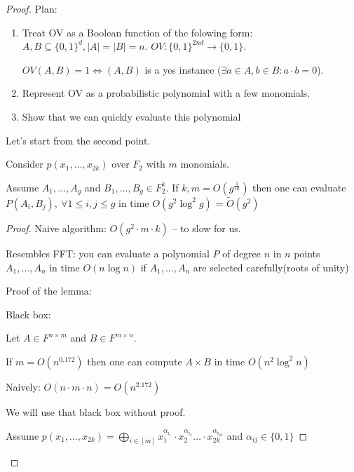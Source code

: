 \begin{proof}
	Plan:
	\begin{enumerate}
		\item Treat OV as a Boolean function of the folowing form: $A, B \subseteq \{0, 1\}^d, |A| = |B| = n$.
			$OV : \{0, 1\}^{2nd} \to \{0, 1\}$.

			$OV(A, B) = 1 \Longleftrightarrow (A, B)$ is a yes instance ($\exists a \in A, b \in B : a \cdot b = 0$).

		\item Represent OV as a probabilistic polynomial with a few monomials.
		\item Show that we can quickly evaluate this polynomial
	\end{enumerate}

	Let's start from the second point.


	\begin{lm}
		Consider $p(x_1, \dots, x_{2k})$ over $F_2$ with $m$ monomials.

		Assume $A_1, \dots, A_g$ and $B_1, \dots, B_g \in F_2^k$.
		If $k, m = O(g^{\frac{1}{10}})$ then one can evaluate $P(A_i, B_j) ,\ \forall 1 \leq i, j \leq g$ in time $O(g^2 \log^2g)$ = $\widetilde{O}(g^2)$
	\end{lm}

	\begin{proof}
		Naive algorithm: $O(g^2 \cdot m \cdot k)$ -- to slow for us.

		\begin{remrk*}
			Resembles FFT: you can evaluate a polynomial $P$ of degree $n$ in $n$ points $A_1, \dots, A_n$ in time $O(n \log n)$ if $A_1, \dots, A_n$ are selected carefully(roots of unity)
		\end{remrk*}

		Proof of the lemma:

		Black box:
		\begin{thm}[Coopersmith, 198?]
			Let $A \in F^{n \times m}$ and $B \in F^{m \times n}$.

			If $m = O(n^{0.172})$ then one can compute $A \times B$ in time $O(n^2 \log ^{2} n)$

			Naively: $O(n \cdot m \cdot n) = O(n^{2.172})$
		\end{thm}

		We will use that black box without proof.

		Assume $p(x_1, \dots ,x_{2k}) = \bigoplus_{i \in [m]} x_1^{\alpha_{i_1}} \cdot x_2^{\alpha_{i_2}} \dots \cdot x_{2k}^{\alpha_{i_{2k}}}$ and $\alpha_{i j} \in \{0, 1\}$


\end{proof}
\end{proof}
